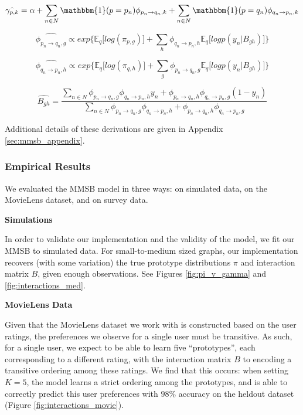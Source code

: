 \[
\hat{\gamma_{p,k}} = \alpha + \sum_{n \in N} \mathbbm{1}(p = p_n)\phi_{p_n \rightarrow q_n,k} + \sum_{n \in N} \mathbbm{1}(p = q_n)\phi_{q_n \rightarrow p_n,k}
\]

\[
\hat{\phi_{p_n \rightarrow q_n,g}} \propto exp\bigg\{\mathbb{E}_q\big[log(\pi_{p,g})\big] + \sum_{h}\phi_{q_n \rightarrow p_n,h}\mathbb{E}_q\big[logp(y_n|B_{gh})\big]\bigg\}
\]

\[
\hat{\phi_{q_n \rightarrow p_n,h}} \propto exp\bigg\{\mathbb{E}_q\big[log(\pi_{q,h})\big] + \sum_{g}\phi_{p_n \rightarrow q_n,g}\mathbb{E}_q\big[logp(y_n|B_{gh})\big]\bigg\}
\]

\[
\hat{B_{gh}} = \frac{
\sum_{n \in N} \phi_{p_n \rightarrow q_n, g} \phi_{q_n \rightarrow p_n, h} y_n + \phi_{p_n \rightarrow q_n, h} \phi_{q_n \rightarrow p_n, g}(1-y_n)
}{
\sum_{n \in N} \phi_{p_n \rightarrow q_n, g} \phi_{q_n \rightarrow p_n, h} + \phi_{p_n \rightarrow q_n, h} \phi_{q_n \rightarrow p_n, g}
}
\]

Additional details of these derivations are given in Appendix \ref{sec:mmsb_appendix}.

\subsubsection{Empirical Results}

We evaluated the MMSB model in three ways: on simulated data, on the MovieLens dataset, and on survey data.

\textbf{Simulations}

In order to validate our implementation and the validity of the model, we fit our MMSB to simulated data.
For small-to-medium sized graphs, our implementation recovers (with some variation) the true prototype distributions $\pi$ and interaction matrix $B$, given enough observations. See Figures \ref{fig:pi_v_gamma} and \ref{fig:interactions_med}.

\textbf{MovieLens Data}

Given that the MovieLens dataset we work with is constructed based on the
user ratings, the preferences we observe for a single user must be transitive.
As such, for a single user, we expect to be able to learn five ``prototypes'', 
each corresponding to a different rating, with the
interaction matrix $B$ to encoding a transitive ordering among these ratings.
We find that this occurs: when setting $K=5$, the model 
learns a strict ordering among the prototypes, and is able to correctly predict 
this user preferences with $98\%$ accuracy on the heldout dataset (Figure \ref{fig:interactions_movie}).  

